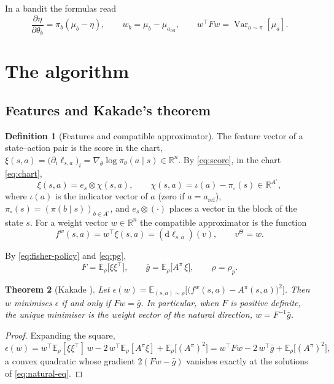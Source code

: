 \documentclass[11pt,a4paper]{article}
\numberwithin{equation}{section}
\theoremstyle{plain}
\newtheorem{theorem}{Theorem}[section]
\theoremstyle{definition}
\newtheorem{definition}[theorem]{Definition}
\theoremstyle{remark}
\newcommand{\R}{\mathbb{R}}
\newcommand{\E}{\mathbb{E}}
\newcommand{\T}{^{\top}}
\newcommand{\dd}{\mathrm{d}}
\DeclareMathOperator{\Var}{Var}
\newcommand{\aref}{a_{\mathrm{ref}}}
\newcommand{\Ao}{A^{\circ}}
\newcommand{\pio}{\pi_{\circ}}
\begin{document}
In a bandit the formulas read
\[
  \frac{\partial\eta}{\partial\theta_b}=\pi_b(\mu_b-\eta),\qquad
  w_b=\mu_b-\mu_{\aref},\qquad
  w\T Fw=\Var_{a\sim\pi}[\mu_a].
\]

\section{The algorithm}\label{sec:algorithm}

\subsection{Features and Kakade's theorem}

\begin{definition}[Features and compatible approximator]\label{def:features}
The feature vector of a state--action pair is the score in the chart,
$\xi(s,a)=\bigl(\partial_i\ell_{s,a}\bigr)_i=\nabla_\theta\log\pi_\theta(a\mid s)\in\R^n$. By \eqref{eq:score}, in the chart \eqref{eq:chart},
\begin{equation}\label{eq:features}
  \xi(s,a)=e_s\otimes\chi(s,a),\qquad\chi(s,a)=\iota(a)-\pio(s)\in\R^{\Ao},
\end{equation}
where $\iota(a)$ is the indicator vector of $a$ (zero if $a=\aref$), $\pio(s)=(\pi(b\mid s))_{b\in\Ao}$, and $e_s\otimes(\cdot)$ places a vector in the block of the state $s$. For a weight vector $w\in\R^n$
the compatible approximator is the function
\begin{equation}\label{eq:compatible}
  f^w(s,a)=w\T\xi(s,a)=(\dd\ell_{s,a})(v),\qquad v^\Theta=w .
\end{equation}
\end{definition}

By \eqref{eq:fisher-policy} and \eqref{eq:pg},
\[
  F=\E_\rho\bigl[\xi\xi\T\bigr],\qquad\bar g=\E_\rho\bigl[A^\pi\,\xi\bigr],\qquad\rho=\rho_p.
\]

\begin{theorem}[Kakade \cite{kakade2001}]\label{thm:kakade}
Let $\epsilon(w)=\E_{(s,a)\sim\rho}\bigl[\bigl(f^w(s,a)-A^\pi(s,a)\bigr)^2\bigr]$. Then $w$ minimises $\epsilon$ if and only if $Fw=\bar g$. In particular, when $F$ is positive definite, the unique minimiser is
the weight vector of the natural direction, $w=F^{-1}\bar g$.
\end{theorem}

\begin{proof}
Expanding the square,
\[
  \epsilon(w)=w\T\E_\rho[\xi\xi\T]\,w-2\,w\T\E_\rho[A^\pi\xi]+\E_\rho\bigl[(A^\pi)^2\bigr]
  =w\T Fw-2\,w\T\bar g+\E_\rho\bigl[(A^\pi)^2\bigr],
\]
a convex quadratic whose gradient $2(Fw-\bar g)$ vanishes exactly at the solutions of \eqref{eq:natural-eq}.
\end{proof}
\end{document}
